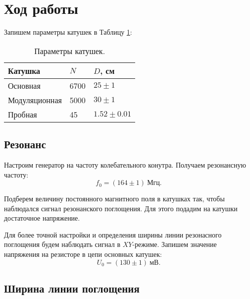     \section*{Ход работы}
    
    Запишем параметры катушек в  Таблицу \ref{table:coils}:
    
    \begin{table}[h]
    \centering
        \begin{tabular}{|l|l|l|}
        \hline
        \textbf{Катушка} & $N$ & $D$, см \\ \hline \hline
        Основная         & 6700         & $25\pm1$             \\ \hline
        Модуляционная    & 5000         & $30\pm1$             \\ \hline
        Пробная          & 45           & $1.52\pm0.01$             \\ \hline
        \end{tabular}
        \caption{Параметры катушек.}
        \label{table:coils}
    \end{table}
    
    \subsection*{Резонанс}
    
    
    Настроим генератор на частоту колебательного конутра. Получаем резонансную частоту:
    \begin{equation*}
        f_0 = (164 \pm 1) \ \text{Мгц}.
    \end{equation*}

    Подберем величину постоянного магнитного поля в катушках так, чтобы наблюдался сигнал резонанского поглощения. Для этого подадим на катушки достаточное напряжение.
    
    Для более точной настройки и определения ширины линии резонасного поглощения будем наблюдать сигнал в $XY$-режиме. Запишем значение напряжения на резисторе в цепи основных катушек:
    \begin{equation*}
        U_0 = (130 \pm 1) \ \text{мВ}.
    \end{equation*}
    
    \subsection*{Ширина линии поглощения}

